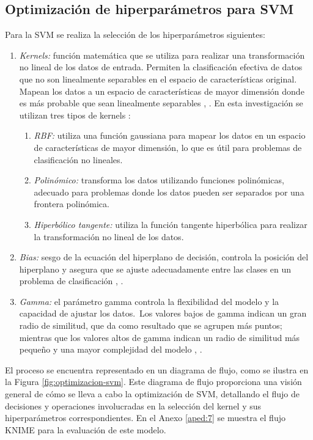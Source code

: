 \subsection{Optimización de hiperparámetros para SVM}

Para la SVM se realiza la selección de los hiperparámetros siguientes:

	\begin{enumerate}
		\item \textit{Kernels:} función matemática que se utiliza para realizar una transformación no lineal de los datos de entrada. Permiten la clasificación efectiva de datos que no son linealmente separables en el espacio de características original. Mapean los datos a un espacio de características de mayor dimensión donde es más probable que sean linealmente separables \citep{scholkopf2018learning}, \citep{bishop2006pattern}. En esta investigación se utilizan tres tipos de kernels \citep{scholkopf2018learning}:
		\begin{enumerate}
			\item \textit{RBF:} utiliza una función gaussiana para mapear los datos en un espacio de características de mayor dimensión, lo que es útil para problemas de clasificación no lineales.
			\item \textit{Polinómico:} transforma los datos utilizando funciones polinómicas, adecuado para problemas donde los datos pueden ser separados por una frontera polinómica.
			\item \textit{Hiperbólico tangente:} utiliza la función tangente hiperbólica para realizar la transformación no lineal de los datos.
		\end{enumerate}
		\item \textit{Bias:} sesgo de la ecuación del hiperplano de decisión, controla la posición del hiperplano y asegura que se ajuste adecuadamente entre las clases en un problema de clasificación \citep{scholkopf2018learning}, \citep{joachims2002learning}.
		\item \textit{Gamma:} el parámetro gamma controla la flexibilidad del modelo y la capacidad de ajustar los datos. Los valores bajos de gamma indican un gran radio de similitud, que da como resultado que se agrupen más puntos; mientras que los valores altos de gamma indican un radio de similitud más pequeño y una mayor complejidad del modelo  \citep{bishop2006pattern}, \citep{scholkopf2018learning}.
	\end{enumerate}


El proceso se encuentra representado en un diagrama de flujo, como se ilustra en la Figura \ref{fig:optimizacion-svm}. Este diagrama de flujo proporciona una visión general de cómo se lleva a cabo la optimización de SVM, detallando el flujo de decisiones y operaciones involucradas en la selección del kernel y sus hiperparámetros correspondientes. En el Anexo \ref{aped:7} se muestra el flujo KNIME para la evaluación de este modelo.


